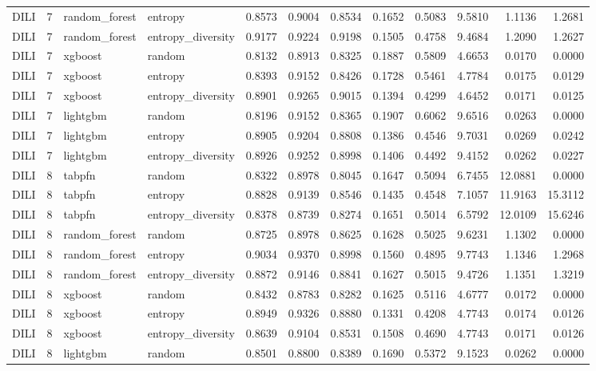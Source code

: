 \begin{tabular}{lrllrrrrrrrr}
DILI & 7 & random_forest & entropy & 0.8573 & 0.9004 & 0.8534 & 0.1652 & 0.5083 & 9.5810 & 1.1136 & 1.2681 \\
DILI & 7 & random_forest & entropy_diversity & 0.9177 & 0.9224 & 0.9198 & 0.1505 & 0.4758 & 9.4684 & 1.2090 & 1.2627 \\
DILI & 7 & xgboost & random & 0.8132 & 0.8913 & 0.8325 & 0.1887 & 0.5809 & 4.6653 & 0.0170 & 0.0000 \\
DILI & 7 & xgboost & entropy & 0.8393 & 0.9152 & 0.8426 & 0.1728 & 0.5461 & 4.7784 & 0.0175 & 0.0129 \\
DILI & 7 & xgboost & entropy_diversity & 0.8901 & 0.9265 & 0.9015 & 0.1394 & 0.4299 & 4.6452 & 0.0171 & 0.0125 \\
DILI & 7 & lightgbm & random & 0.8196 & 0.9152 & 0.8365 & 0.1907 & 0.6062 & 9.6516 & 0.0263 & 0.0000 \\
DILI & 7 & lightgbm & entropy & 0.8905 & 0.9204 & 0.8808 & 0.1386 & 0.4546 & 9.7031 & 0.0269 & 0.0242 \\
DILI & 7 & lightgbm & entropy_diversity & 0.8926 & 0.9252 & 0.8998 & 0.1406 & 0.4492 & 9.4152 & 0.0262 & 0.0227 \\
DILI & 8 & tabpfn & random & 0.8322 & 0.8978 & 0.8045 & 0.1647 & 0.5094 & 6.7455 & 12.0881 & 0.0000 \\
DILI & 8 & tabpfn & entropy & 0.8828 & 0.9139 & 0.8546 & 0.1435 & 0.4548 & 7.1057 & 11.9163 & 15.3112 \\
DILI & 8 & tabpfn & entropy_diversity & 0.8378 & 0.8739 & 0.8274 & 0.1651 & 0.5014 & 6.5792 & 12.0109 & 15.6246 \\
DILI & 8 & random_forest & random & 0.8725 & 0.8978 & 0.8625 & 0.1628 & 0.5025 & 9.6231 & 1.1302 & 0.0000 \\
DILI & 8 & random_forest & entropy & 0.9034 & 0.9370 & 0.8998 & 0.1560 & 0.4895 & 9.7743 & 1.1346 & 1.2968 \\
DILI & 8 & random_forest & entropy_diversity & 0.8872 & 0.9146 & 0.8841 & 0.1627 & 0.5015 & 9.4726 & 1.1351 & 1.3219 \\
DILI & 8 & xgboost & random & 0.8432 & 0.8783 & 0.8282 & 0.1625 & 0.5116 & 4.6777 & 0.0172 & 0.0000 \\
DILI & 8 & xgboost & entropy & 0.8949 & 0.9326 & 0.8880 & 0.1331 & 0.4208 & 4.7743 & 0.0174 & 0.0126 \\
DILI & 8 & xgboost & entropy_diversity & 0.8639 & 0.9104 & 0.8531 & 0.1508 & 0.4690 & 4.7743 & 0.0171 & 0.0126 \\
DILI & 8 & lightgbm & random & 0.8501 & 0.8800 & 0.8389 & 0.1690 & 0.5372 & 9.1523 & 0.0262 & 0.0000 \\

\end{tabular}
